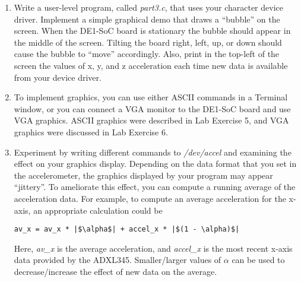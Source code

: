 \documentclass[epsfig,10pt,fullpage]{article}
\begin{document}
\begin{enumerate}
\begin{figure}[h]
\begin{center}
\begin{minipage}[t]{15 cm}
\begin{lstlisting}[name=dots]
static ssize_t device_read(struct file *filp, char *buffer, size_t length, loff_t *offset)
{
	|$\ldots$| code not shown
}
\end{lstlisting}
\end{minipage}
\caption{An outline of the ADXL345 device driver code.}
\label{fig:accel}
\end{center}
\end{figure}
\clearpage
\item Write a user-level program, called {\it part3.c}, that uses your character device driver.
Implement a simple graphical demo that draws a ``bubble'' on the screen. When the DE1-SoC
board is stationary the bubble should appear in the middle of the screen. Tilting the
board right, left, up, or down should cause the bubble to ``move'' accordingly.
Also, print in the top-left of the screen the values of x, y, and z acceleration each time
new data is available from your device driver.
\item To implement graphics, you can use either ASCII commands in a Terminal window, or you can
connect a VGA monitor to the DE1-SoC board and use VGA graphics.  ASCII graphics were
described in Lab Exercise 5, and VGA graphics were discussed in Lab Exercise 6.
\item Experiment by writing different commands to {\it /dev/accel} and examining the effect
on your graphics display. Depending on the data format that you set in the accelerometer,
the graphics displayed by your program may appear ``jittery''. To ameliorate this effect,
you can compute a running average of the acceleration data. For example, to compute an
average acceleration for the x-axis, an appropriate calculation could be
\lstset{language=C,numbers=none}
\begin{lstlisting}
av_x = av_x * |$\alpha$| + accel_x * |$(1 - \alpha)$|
\end{lstlisting}
Here, {\it av\_x} is the average acceleration, and {\it accel\_x} is the most recent
x-axis data provided by the ADXL345. Smaller/larger values of $\alpha$ can be used to
decrease/increase the effect of new data on the average.
\end{enumerate}
\end{document}
